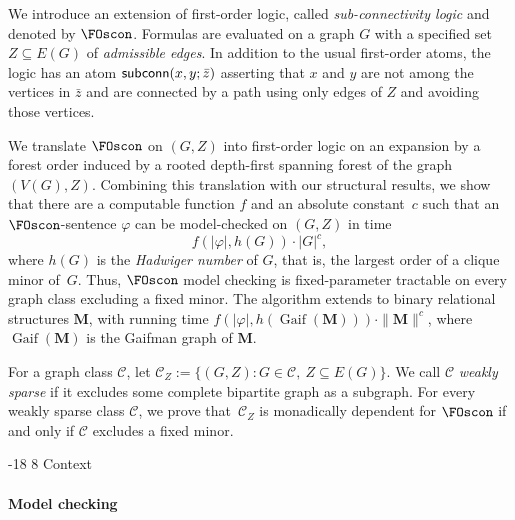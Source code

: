 \documentclass[1p,number,11pt]{elsarticle}
\makeatletter
\renewcommand\subsection{\@startsection{subsection}{2}{\z@}%
  {-18\p@ \@plus -4\p@ \@minus -4\p@}%
  {8\p@ \@plus 4\p@ \@minus 4\p@}%
  {\normalfont\normalsize\bfseries}}
\newcommand{\scon}{\hbox{\sf subconn}}
\renewcommand{\phi}{\varphi}
\newcommand{\Gaif}{\operatorname{Gaif}}
\theoremstyle{plain}
\newcommand{\Cc}{\mathscr{C}}
\makeatother
\begin{document}
We introduce an extension of first-order logic, called \emph{sub-connectivity logic} and denoted by $\FOscon$. 
Formulas are evaluated on a graph $G$ with a specified set $Z\subseteq E(G)$ of \emph{admissible edges}. In addition to the usual first-order atoms, the logic has an atom $\scon(x,y;\bar z)$ asserting that $x$ and $y$ are not among the vertices in $\bar z$ and are connected by a path using only edges of $Z$ and avoiding those vertices. 

We translate $\FOscon$ on $(G,Z)$ into first-order logic on an expansion by a forest order induced by a rooted depth-first spanning forest of the graph $(V(G),Z)$. 
Combining this translation with our structural results, we show that there are a computable function $f$ and an absolute constant~$c$ such that an $\FOscon$-sentence $\phi$ can be model-checked on $(G,Z)$ in time
\[
 f(|\phi|,h(G))\cdot |G|^c,
\]
where $h(G)$ is the \emph{Hadwiger number} of $G$, that is, the largest order of a clique minor of~$G$. 
Thus, $\FOscon$ model checking is fixed-parameter tractable on every graph class excluding a fixed minor.
The algorithm extends to binary relational structures $\mathbf M$, with running time $f(|\phi|,h(\Gaif(\mathbf M)))\cdot\|\mathbf M\|^c$, where $\Gaif(\mathbf M)$ is the Gaifman graph of $\mathbf M$. 

For a graph class $\Cc$, let $\Cc_Z:=\{(G,Z):G\in\Cc,\ Z\subseteq E(G)\}$. We call $\Cc$ \emph{weakly sparse} if it excludes some complete bipartite graph as a subgraph. 
For every weakly sparse class $\Cc$, we prove that~$\Cc_Z$ is monadically dependent for $\FOscon$ if and only if $\Cc$ excludes a fixed minor. 


\pagebreak
\subsection{Context}
\paragraph{Model checking}
 
\end{document}
